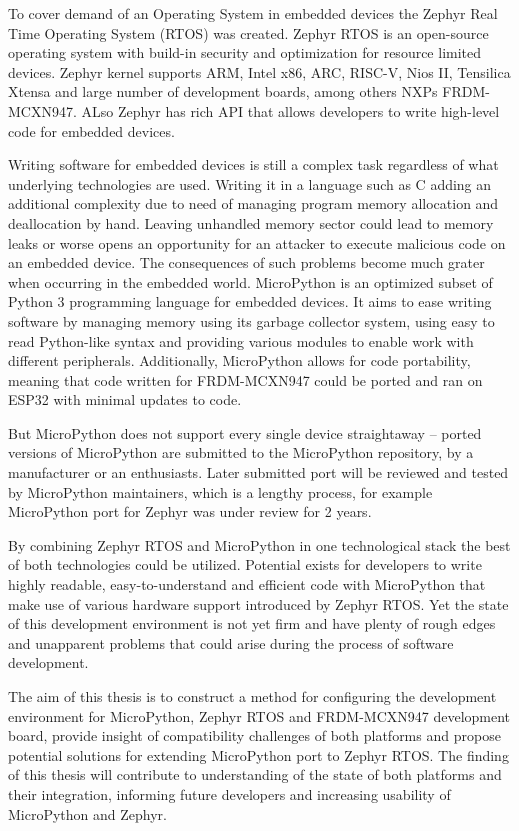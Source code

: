 \documentclass[twoside, 12pt]{article}
\begin{document}
To cover demand of an Operating System in embedded devices the Zephyr Real Time Operating 
System (RTOS) was created. Zephyr RTOS is an open-source operating system with build-in 
security and optimization for resource limited devices. Zephyr kernel supports ARM, Intel 
x86, ARC, RISC-V, Nios II, Tensilica Xtensa and large number of development boards, among 
others NXPs FRDM-MCXN947. ALso Zephyr has rich API that allows developers to write high-level 
code for embedded devices.

Writing software for embedded devices is still a complex task regardless of what underlying 
technologies are used. Writing it in a language such as C adding an additional complexity
due to need of managing program memory allocation and deallocation by hand.
Leaving unhandled memory sector could lead to memory leaks or worse opens an opportunity for
an attacker to execute malicious code on an embedded device. The consequences of such problems
become much grater when occurring in the embedded world. MicroPython is an optimized subset 
of Python 3 programming language for embedded devices. It aims to ease writing software by 
managing memory using its garbage collector system, using easy to read Python-like syntax and 
providing various modules to enable work with different peripherals. Additionally, 
MicroPython allows for code portability, meaning that code written for FRDM-MCXN947
could be ported and ran on ESP32 with minimal updates to code. 

But MicroPython does not 
support every single device straightaway -- ported versions of MicroPython are submitted to 
the MicroPython repository, by a manufacturer or an enthusiasts. Later submitted port will be 
reviewed and tested by MicroPython maintainers, which is a lengthy process, for example 
MicroPython port for Zephyr was under review for 2 years.

By combining Zephyr RTOS and MicroPython in one technological stack the best of both 
technologies could be utilized. Potential exists for developers to write highly readable,
easy-to-understand and efficient code with MicroPython that make use of various hardware 
support introduced by Zephyr RTOS. Yet the state of this development environment is not yet 
firm and have plenty of rough edges and unapparent problems that could arise during the 
process of software development.

The aim of this thesis is to construct a method for configuring the development environment 
for MicroPython, Zephyr RTOS and FRDM-MCXN947 development board, provide insight of 
compatibility challenges of both platforms and propose potential solutions for extending 
MicroPython port to Zephyr RTOS. The finding of this thesis will contribute to understanding 
of the state of both platforms and their integration, informing future developers and increasing usability of MicroPython and Zephyr.
\end{document}
